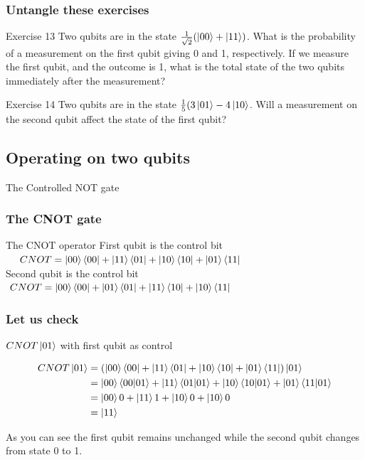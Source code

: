 \documentclass[10pt]{beamer}
\begin{document}
\begin{frame}
  \frametitle{Untangle these exercises}
  \begin{block}{Exercise 13}
    Two qubits are in the state $\frac{1}{\sqrt{2}}(\ket{00}+\ket{11})$. What is the probability of a measurement on the first qubit giving 0 and 1, respectively. If we measure the first qubit, and the outcome is 1, what is the total state of the two qubits immediately after the measurement?
  \end{block}
  \begin{block}{Exercise 14}
   Two qubits are in the state $\frac{1}{5}(3\ket{01}-4\ket{10}$. Will a measurement on the second qubit affect the state of the first qubit? 
  \end{block}
\end{frame}
\begin{frame}
  \section{Operating on two qubits}
  \centering
  The Controlled NOT gate
\end{frame}
\begin{frame}
  \frametitle{The CNOT gate}
  \begin{block}{The CNOT operator}
    First qubit is the control bit
 $  \ \ \ \ CNOT=\ket{00}\bra{00}+\ket{11}\bra{01}+\ket{10}\bra{10}+\ket{01}\bra{11}$
 \\ Second qubit is the control bit $ \ CNOT=\ket{00}\bra{00}+\ket{01}\bra{01}+\ket{11}\bra{10}+\ket{10}\bra{11}$
  \end{block}


\end{frame}
\begin{frame}
  \frametitle{Let us check}
  \begin{block}{$CNOT\ket{01}$ with first qubit as control}
    
\begin{align*}
  CNOT \ket{01} &=\left( \ket{00}\bra{00}+\ket{11}\bra{01}+\ket{10}\bra{10}+\ket{01}\bra{11} \right) \ket{01} \\
                &= \ket{00}\braket{00|01}+\ket{11}\braket{01|01}+\ket{10}\braket{10|01}+\ket{01}\braket{11|01} \\
                &= \ket{00} 0 + \ket{11} 1 + \ket{10} 0 + \ket{10} 0 \\
  &= \ket{11}
\end{align*}
  \end{block}
  As you can see the first qubit remains unchanged while the second qubit changes from state 0 to 1.

\end{frame}
\end{document}
